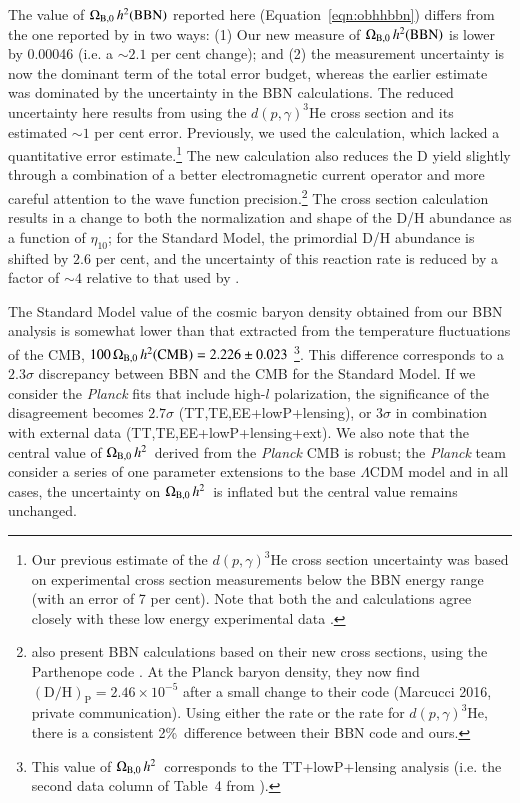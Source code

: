 \documentclass[12pt,preprint,useAMS,usenatbib]{emulateapj}
\newcommand{\obhh}{$\Omega_{\rm B,0}\,h^{2}$}
\begin{document}
The value of $\Omega_{\rm B,0}\,h^{2}({\rm BBN})$ reported here
(Equation~\ref{eqn:obhhbbn}) differs from the one reported by
\citet{Coo14} in two ways: (1) Our new measure of $\Omega_{\rm B,0}\,h^{2}({\rm BBN})$
is lower by 0.00046 (i.e. a $\sim2.1$ per cent change); and (2) the measurement
uncertainty is now the dominant term of the total error budget, whereas
the earlier estimate was dominated by the uncertainty in the BBN calculations.
The reduced uncertainty here results from using the \citet{Mar16}
$d(p,\gamma)^3\mathrm{He}$ cross section and its estimated
$\sim1$ per cent error.  Previously, we used the \citet{Mar05} calculation,
which lacked a quantitative error estimate.\footnote{Our previous estimate
of the $d(p,\gamma)^3\mathrm{He}$ cross section uncertainty was based on
experimental cross section measurements below the BBN energy range
(with an error of 7 per cent). Note that both the \citet{Mar05} and \citet{Mar16}
calculations agree closely with these low energy experimental data \citep{NolHol11}.}
The new calculation also reduces the D yield slightly through a
combination of a better electromagnetic current operator and more
careful attention to the wave function precision.\footnote{\citet{Mar16}
also present BBN calculations based on their
new cross sections, using the Parthenope code \citep{Pis08}.
At the Planck baryon
density, they now find $(\mathrm{D/H})_\mathrm{P} = 2.46\times
10^{-5}$ after a small change to their code (Marcucci 2016, private
communication).  Using either the \citet{Mar16} rate or the
\citet{Ade11} rate for $d(p,\gamma)^3\mathrm{He}$, there is
a consistent 2\%\ difference between their BBN code and ours.}
The \citet{Mar16} cross section calculation
results in a change to both the normalization and shape of the D/H abundance as a
function of $\eta_{10}$; for the Standard Model, the primordial D/H abundance is
shifted by $2.6$ per cent, and the uncertainty of this reaction rate is reduced by a factor of
$\sim4$ relative to that used by \citet{Coo14}.

The Standard Model value of the cosmic baryon density
obtained from our BBN analysis is somewhat lower than
that extracted from the temperature fluctuations of the CMB,
$100\,\Omega_{\rm B,0}\,h^{2}({\rm CMB})=2.226\pm0.023$
\citep[][see gray bands in Fig.~\ref{fig:measures}]{Efs15}\footnote{This
value of \obhh\ corresponds to the TT+lowP+lensing analysis
 (i.e. the second data column of Table~4 from \citealt{Efs15}).}.
This difference corresponds to a $2.3\sigma$ discrepancy
between BBN and the CMB for the Standard Model.
If we consider the \textit{Planck} fits that include high-$l$
polarization, the significance of the disagreement becomes $2.7\sigma$
(TT,TE,EE+lowP+lensing), or $3\sigma$ in combination with external
data (TT,TE,EE+lowP+lensing+ext).
We also note that the central value of \obhh\ derived from the
\textit{Planck} CMB is robust; the \textit{Planck} team consider a series of one
parameter extensions to the base $\Lambda$CDM model and
in all cases, the uncertainty on \obhh\ is inflated but
the central value remains unchanged.
\end{document}
